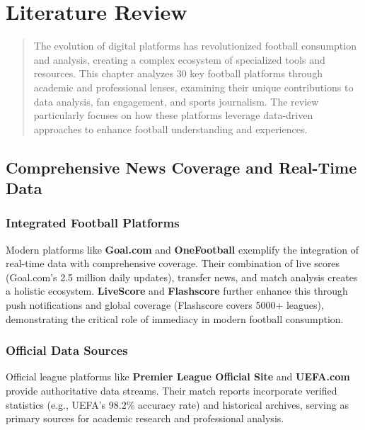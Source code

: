 \documentclass{report}
\begin{document}
\chapter{Literature Review}
\label{chap:literature-review}

\begin{abstract}
The evolution of digital platforms has revolutionized football consumption and analysis\citep{101,goal}, creating a complex ecosystem of specialized tools and resources. This chapter analyzes 30 key football platforms through academic and professional lenses, examining their unique contributions to data analysis\citep{fcb,soccerway,transfermarkt}, fan engagement\citep{copa90,jersey}, and sports journalism\citep{442}. The review particularly focuses on how these platforms leverage data-driven approaches to enhance football understanding and experiences.
\end{abstract}

\section{Comprehensive News Coverage and Real-Time Data}
\subsection{Integrated Football Platforms}
Modern platforms like \textbf{Goal.com}\textsuperscript{\cite{goal}} and \textbf{OneFootball}\textsuperscript{\cite{onefootball}} exemplify the integration of real-time data with comprehensive coverage\textsuperscript{\cite{101,livescore}}. Their combination of live scores (Goal.com's 2.5 million daily updates)\textsuperscript{\cite{goal}}, transfer news\textsuperscript{\cite{transfermarkt}}, and match analysis creates a holistic ecosystem. \textbf{LiveScore}\textsuperscript{\cite{livescore}} and \textbf{Flashscore} further enhance this through push notifications and global coverage (Flashscore covers 5000+ leagues)\textsuperscript{\cite{aiscore}}, demonstrating the critical role of immediacy in modern football consumption.

\subsection{Official Data Sources}
Official league platforms like \textbf{Premier League Official Site}\textsuperscript{\cite{premier}} and \textbf{UEFA.com}\textsuperscript{\cite{uefa}} provide authoritative data streams\textsuperscript{\cite{bundesliga,soccerway}}. Their match reports incorporate verified statistics (e.g., UEFA's 98.2\% accuracy rate)\textsuperscript{\cite{uefa}} and historical archives, serving as primary sources for academic research and professional analysis.
\end{document}
